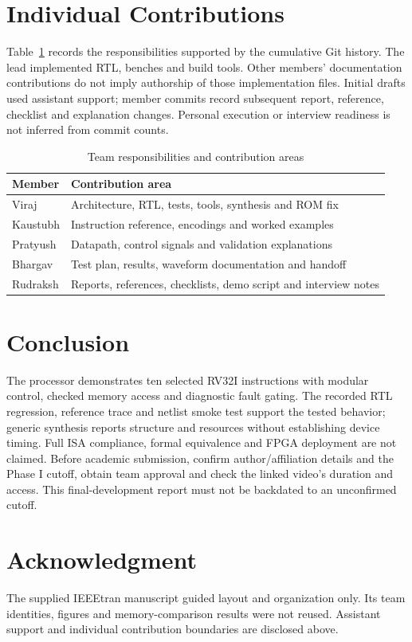 \documentclass[conference,a4paper]{IEEEtran}
\begin{document}
\balance
\section{Individual Contributions}
Table~\ref{tab:members} records the responsibilities supported by the cumulative
Git history. The lead implemented RTL, benches and build tools. Other members'
documentation contributions do not imply authorship of those implementation files.
Initial drafts used assistant support; member commits record subsequent report,
reference, checklist and explanation changes. Personal execution or interview
readiness is not inferred from commit counts.

\begin{table}[t]
\caption{Team responsibilities and contribution areas}
\label{tab:members}
\centering\small
\begin{tabular}{p{}p{}}
\toprule Member & Contribution area\\\midrule
Viraj & Architecture, RTL, tests, tools, synthesis and ROM fix\\
Kaustubh & Instruction reference, encodings and worked examples\\
Pratyush & Datapath, control signals and validation explanations\\
Bhargav & Test plan, results, waveform documentation and handoff\\
Rudraksh & Reports, references, checklists, demo script and interview notes\\\bottomrule
\end{tabular}
\end{table}

\section{Conclusion}
The processor demonstrates ten selected RV32I instructions with modular control,
checked memory access and diagnostic fault gating. The recorded RTL regression,
reference trace and netlist smoke test support the tested behavior; generic
synthesis reports structure and resources without establishing device timing.
Full ISA compliance, formal equivalence and FPGA deployment are not claimed.
Before academic submission, confirm author/affiliation details and the Phase I
cutoff, obtain team approval and check the linked video's duration and access.
This final-development report must not be backdated to an unconfirmed cutoff.

\section*{Acknowledgment}
The supplied IEEEtran manuscript guided layout and organization only. Its team
identities, figures and memory-comparison results were not reused. Assistant
support and individual contribution boundaries are disclosed above.
\end{document}
